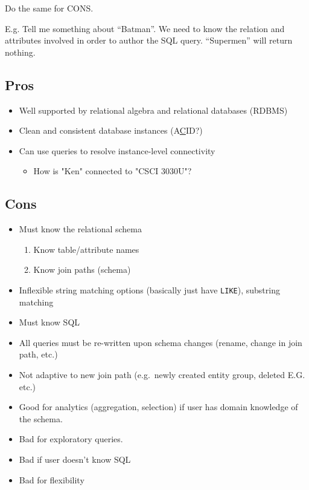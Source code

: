 		Do the same for CONS.
		
		E.g. Tell me something about ``Batman''.  We need to know the relation and attributes involved in order to author the SQL query.  ``Supermen'' will return nothing.
		
		\subsection{Pros}
			\begin{itemize}
				\item Well supported by relational algebra and relational databases (RDBMS)
				\item Clean and consistent database instances (A\underline{C}ID?)
				\item Can use queries to resolve instance-level connectivity
					\begin{itemize}
						\item How is "Ken" connected to "CSCI 3030U"?
					\end{itemize}
			\end{itemize}
		
		\subsection{Cons}
			\begin{itemize}
				\item Must know the relational schema
					\begin{enumerate}
						\item Know table/attribute names
						\item Know join paths (schema)
					\end{enumerate}
				\item Inflexible string matching options  (basically just have \texttt{LIKE}), substring matching
				\item Must know SQL
				\item All queries must be re-written upon schema changes (rename, change in join path, etc.)
				\item Not adaptive to new join path (e.g.\ newly created entity group, deleted E.G.\, etc.)
			\end{itemize}
	
		\begin{itemize}
			\item Good for analytics (aggregation, selection) if user has domain knowledge of the schema.
			\item Bad for exploratory queries.
			\item Bad if user doesn't know SQL
			\item Bad for flexibility
		\end{itemize}